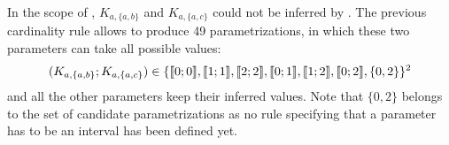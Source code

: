 
\begin{example}\label{ex:cardinality}
In the scope of , $K_{a,\{a,b\}}$ and $K_{a,\{a,c\}}$ could not be inferred by .
The previous cardinality rule allows to produce 49 parametrizations, in which these two parameters can take all possible values:
\begin{align*}
  (K_{a,\{a,b\}} ; K_{a,\{a,c\}}) \in \{ \llbracket 0 ; 0 \rrbracket , \llbracket 1 ; 1 \rrbracket , \llbracket 2 ; 2 \rrbracket , \llbracket 0 ; 1 \rrbracket , \llbracket 1 ; 2 \rrbracket , \llbracket 0 ; 2 \rrbracket, \{ 0, 2 \} \}^2
\end{align*}
and all the other parameters keep their inferred values.
Note that $\{ 0, 2 \}$ belongs to the set of candidate parametrizations
as no rule specifying that a parameter has to be an interval has been defined yet.
\end{example}



